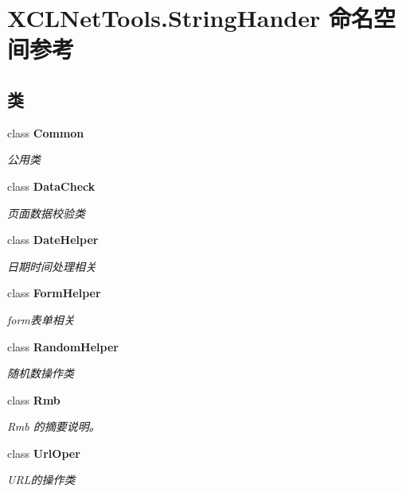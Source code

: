 \hypertarget{namespace_x_c_l_net_tools_1_1_string_hander}{}\section{X\+C\+L\+Net\+Tools.\+String\+Hander 命名空间参考}
\label{namespace_x_c_l_net_tools_1_1_string_hander}
\subsection*{类}
\begin{DoxyCompactItemize}
\item 
class {\bfseries Common}
\begin{DoxyCompactList}\small\item\em 公用类 \end{DoxyCompactList}\item 
class {\bfseries Data\+Check}
\begin{DoxyCompactList}\small\item\em 页面数据校验类 \end{DoxyCompactList}\item 
class {\bfseries Date\+Helper}
\begin{DoxyCompactList}\small\item\em 日期时间处理相关 \end{DoxyCompactList}\item 
class {\bfseries Form\+Helper}
\begin{DoxyCompactList}\small\item\em form表单相关 \end{DoxyCompactList}\item 
class {\bfseries Random\+Helper}
\begin{DoxyCompactList}\small\item\em 随机数操作类 \end{DoxyCompactList}\item 
class {\bfseries Rmb}
\begin{DoxyCompactList}\small\item\em Rmb 的摘要说明。 \end{DoxyCompactList}\item 
class {\bfseries Url\+Oper}
\begin{DoxyCompactList}\small\item\em U\+R\+L的操作类 \end{DoxyCompactList}\end{DoxyCompactItemize}
